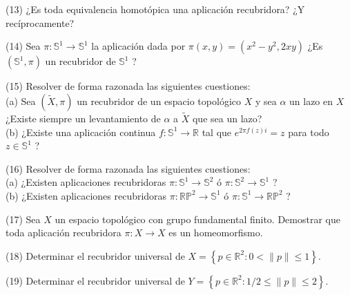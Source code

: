 \documentclass[
  a4paper,
  spanish,
  12pt,
]{scrartcl}
\begin{document}
\begin{ejer}
(13) ¿Es toda equivalencia homotópica una aplicación recubridora? ¿Y recíprocamente?\\
\end{ejer}

\begin{ejer}
(14) Sea $\pi: \mathbb{S}^{1} \rightarrow \mathbb{S}^{1}$ la aplicación dada por $\pi(x, y)=\left(x^{2}-y^{2}, 2 x y\right)$ ¿Es $\left(\mathbb{S}^{1}, \pi\right)$ un recubridor de $\mathbb{S}^{1}$ ?\\
\end{ejer}

\begin{ejer}
(15) Resolver de forma razonada las siguientes cuestiones:\\
(a) Sea $(\widetilde{X}, \pi)$ un recubridor de un espacio topológico $X$ y sea $\alpha$ un lazo en $X$ ¿Existe siempre un levantamiento de $\alpha$ a $\widetilde{X}$ que sea un lazo?\\
(b) ¿Existe una aplicación continua $f: \mathbb{S}^{1} \rightarrow \mathbb{R}$ tal que $e^{2 \pi f(z) i}=z$ para todo $z \in \mathbb{S}^{1}$ ?\\
\end{ejer}

\begin{ejer}
(16) Resolver de forma razonada las siguientes cuestiones:\\
(a) ¿Existen aplicaciones recubridoras $\pi: \mathbb{S}^{1} \rightarrow \mathbb{S}^{2}$ ó $\pi: \mathbb{S}^{2} \rightarrow \mathbb{S}^{1}$ ?\\
(b) ¿Existen aplicaciones recubridoras $\pi: \mathbb{R} \mathbb{P}^{2} \rightarrow \mathbb{S}^{1}$ ó $\pi: \mathbb{S}^{1} \rightarrow \mathbb{R} \mathbb{P}^{2}$ ?\\
\end{ejer}

\begin{ejer}
(17) Sea $X$ un espacio topológico con grupo fundamental finito. Demostrar que toda aplicación recubridora $\pi: X \rightarrow X$ es un homeomorfismo.\\
\end{ejer}

\begin{ejer}
(18) Determinar el recubridor universal de $X=\left\{p \in \mathbb{R}^{2}: 0<\|p\| \leq 1\right\}$.\\
\end{ejer}

\begin{ejer}
(19) Determinar el recubridor universal de $Y=\left\{p \in \mathbb{R}^{2}: 1 / 2 \leq\|p\| \leq 2\right\}$.\\
\end{ejer}
\end{document}
